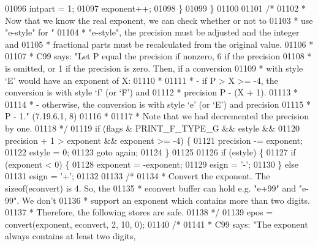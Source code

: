 \begin{DoxyCode}
{{{{{{{{{01096             intpart = 1;
01097             exponent++;
01098         \}
01099     \}
01100 
01101     \textcolor{comment}{/*}
01102 \textcolor{comment}{     * Now that we know the real exponent, we can check whether or not to}
01103 \textcolor{comment}{     * use "e-style" for "%
01104 \textcolor{comment}{     * "e-style", the precision must be adjusted and the integer and}
01105 \textcolor{comment}{     * fractional parts must be recalculated from the original value.}
01106 \textcolor{comment}{     *}
01107 \textcolor{comment}{     * C99 says: "Let P equal the precision if nonzero, 6 if the precision}
01108 \textcolor{comment}{     * is omitted, or 1 if the precision is zero.  Then, if a conversion}
01109 \textcolor{comment}{     * with style `E' would have an exponent of X:}
01110 \textcolor{comment}{     *}
01111 \textcolor{comment}{     * - if P > X >= -4, the conversion is with style `f' (or `F') and}
01112 \textcolor{comment}{     *   precision P - (X + 1).}
01113 \textcolor{comment}{     *}
01114 \textcolor{comment}{     * - otherwise, the conversion is with style `e' (or `E') and precision}
01115 \textcolor{comment}{     *   P - 1." (7.19.6.1, 8)}
01116 \textcolor{comment}{     *}
01117 \textcolor{comment}{     * Note that we had decremented the precision by one.}
01118 \textcolor{comment}{     */}
01119     \textcolor{keywordflow}{if} (flags & PRINT\_F\_TYPE\_G && estyle &&
01120         precision + 1 > exponent && exponent >= -4) \{
01121         precision -= exponent;
01122         estyle = 0;
01123         \textcolor{keywordflow}{goto} again;
01124     \}
01125 
01126     \textcolor{keywordflow}{if} (estyle) \{
01127         \textcolor{keywordflow}{if} (exponent < 0) \{
01128             exponent = -exponent;
01129             esign = \textcolor{charliteral}{'-'};
01130         \} \textcolor{keywordflow}{else}
01131             esign = \textcolor{charliteral}{'+'};
01132 
01133         \textcolor{comment}{/*}
01134 \textcolor{comment}{         * Convert the exponent.  The sizeof(econvert) is 4.  So, the}
01135 \textcolor{comment}{         * econvert buffer can hold e.g. "e+99" and "e-99".  We don't}
01136 \textcolor{comment}{         * support an exponent which contains more than two digits.}
01137 \textcolor{comment}{         * Therefore, the following stores are safe.}
01138 \textcolor{comment}{         */}
01139         epos = convert(exponent, econvert, 2, 10, 0);
01140         \textcolor{comment}{/*}
01141 \textcolor{comment}{         * C99 says: "The exponent always contains at least two digits,}
}}}}}}}}}}
\end{DoxyCode}
